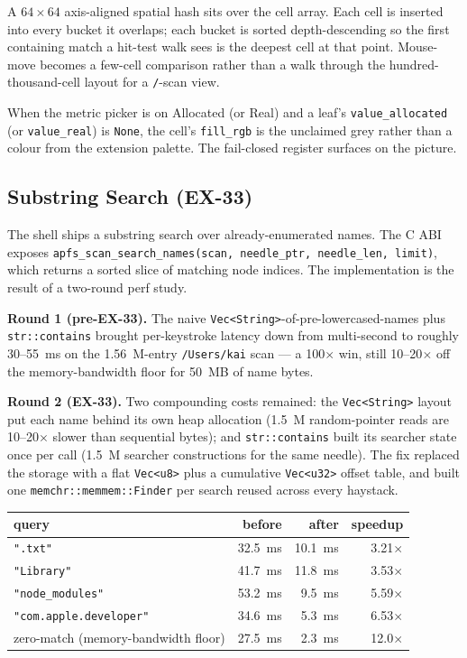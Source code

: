 A $64 \times 64$ axis-aligned spatial hash sits over the cell
array. Each cell is inserted into every bucket it overlaps; each
bucket is sorted depth-descending so the first containing match a
hit-test walk sees is the deepest cell at that point. Mouse-move
becomes a few-cell comparison rather than a walk through the
hundred-thousand-cell layout for a \texttt{/}-scan view.

When the metric picker is on Allocated (or Real) and a leaf's
\texttt{value\_allocated} (or \texttt{value\_real}) is
\texttt{None}, the cell's \texttt{fill\_rgb} is the unclaimed
grey rather than a colour from the extension palette. The
fail-closed register surfaces on the picture.

\subsection{Substring Search (EX-33)}
\label{ssec:search-perf}

The shell ships a substring search over already-enumerated names.
The C ABI exposes \texttt{apfs\_scan\_search\_names(scan,
needle\_ptr, needle\_len, limit)}, which returns a sorted slice
of matching node indices. The implementation is the result of a
two-round perf study.

\textbf{Round 1 (pre-EX-33).} The naive
\texttt{Vec<String>}-of-pre-lowercased-names plus
\texttt{str::contains} brought per-keystroke latency down from
multi-second to roughly 30--55~ms on the 1.56~M-entry
\texttt{/Users/kai} scan --- a 100$\times$ win, still 10--20$\times$
off the memory-bandwidth floor for 50~MB of name bytes.

\textbf{Round 2 (EX-33).} Two compounding costs remained: the
\texttt{Vec<String>} layout put each name behind its own heap
allocation (1.5~M random-pointer reads are 10--20$\times$ slower
than sequential bytes); and \texttt{str::contains} built its
searcher state once per call (1.5~M searcher constructions for
the same needle). The fix replaced the storage with a flat
\texttt{Vec<u8>} plus a cumulative \texttt{Vec<u32>} offset
table, and built one \texttt{memchr::memmem::Finder} per search
reused across every haystack.

\begin{center}
\begin{tabular}{lrrr}
\toprule
query                              & before & after & speedup \\
\midrule
\texttt{".txt"}                    & 32.5~ms & 10.1~ms & 3.21$\times$ \\
\texttt{"Library"}                 & 41.7~ms & 11.8~ms & 3.53$\times$ \\
\texttt{"node\_modules"}           & 53.2~ms &  9.5~ms & 5.59$\times$ \\
\texttt{"com.apple.developer"}     & 34.6~ms &  5.3~ms & 6.53$\times$ \\
zero-match (memory-bandwidth floor)& 27.5~ms &  2.3~ms & 12.0$\times$ \\
\bottomrule
\end{tabular}
\end{center}

